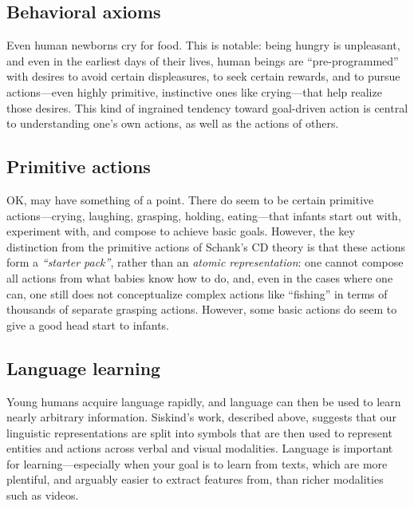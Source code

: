 \subsection{Behavioral axioms}
\label{sec:schema_behavior}
Even human newborns cry for food. This is notable: being hungry is unpleasant, and even in the earliest days of their lives, human beings are ``pre-programmed'' with desires to avoid certain displeasures, to seek certain rewards, and to pursue actions---even highly primitive, instinctive ones like crying---that help realize those desires. This kind of ingrained tendency toward goal-driven action is central to understanding one's own actions, as well as the actions of others.
    
\subsection{Primitive actions}
\label{sec:schema_primitives}
OK, \citep{schank1975concdep} may have something of a point. There do seem to be certain primitive actions---crying, laughing, grasping, holding, eating---that infants start out with, experiment with, and compose to achieve basic goals. However, the key distinction from the primitive actions of Schank's CD theory is that these actions form a \textit{``starter pack''}, rather than an \textit{atomic representation}: one cannot compose all actions from what babies know how to do, and, even in the cases where one can, one still does not conceptualize complex actions like ``fishing'' in terms of thousands of separate grasping actions. However, some basic actions do seem to give a good head start to infants.
    
\subsection{Language learning}
Young humans acquire language rapidly, and language can then be used to learn nearly arbitrary information. Siskind's work, described above, suggests that our linguistic representations are split into symbols that are then used to represent entities and actions across verbal and visual modalities. Language is important for learning---especially when your goal is to learn from texts, which are more plentiful, and arguably easier to extract features from, than richer modalities such as videos.

